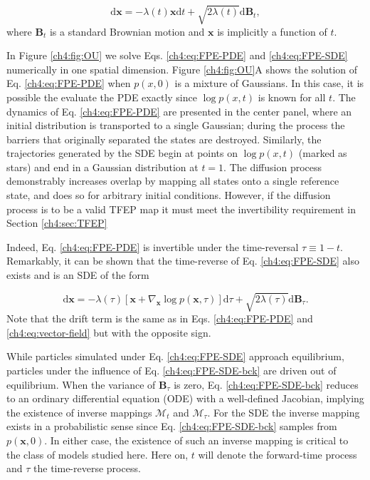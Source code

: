 \begin{equation}
    \mathrm{d}\mathbf{x} = -\lambda(t)\mathbf{x}\mathrm{d}t + \sqrt{2\lambda(t)}\mathrm{d}\mathbf{B}_t,
    \label{ch4:eq:FPE-SDE}
\end{equation}
where $\mathbf{B}_t$ is a standard Brownian motion and $\mathbf{x}$ is implicitly a function of $t$. 

In Figure \ref{ch4:fig:OU} we solve Eqs. \ref{ch4:eq:FPE-PDE} and \ref{ch4:eq:FPE-SDE} numerically in one spatial dimension. Figure \ref{ch4:fig:OU}A shows the solution of Eq. \ref{ch4:eq:FPE-PDE} when $p(x,0)$ is a mixture of Gaussians. In this case, it is possible the evaluate the PDE exactly since $\log p(x,t)$ is known for all $t$. The dynamics of Eq. \ref{ch4:eq:FPE-PDE} are presented in the center panel, where an initial distribution is transported to a single Gaussian; during the process the barriers that originally separated the states are destroyed. Similarly, the trajectories generated by the SDE begin at points on $\log p(x,t)$ (marked as stars) and end in a Gaussian distribution at $t=1$. The diffusion process demonstrably increases overlap by mapping all states onto a single reference state, and does so for arbitrary initial conditions. However, if the diffusion process is to be a valid TFEP map it must meet the invertibility requirement in Section \ref{ch4:sec:TFEP}

Indeed, Eq. \ref{ch4:eq:FPE-PDE} is invertible under the time-reversal $\tau \equiv 1 - t$. Remarkably, it can be shown that the time-reverse of Eq. \ref{ch4:eq:FPE-SDE} also exists \cite{Anderson1982} and is an SDE  of the form

\begin{equation}
    \mathrm{d}\mathbf{x} = -\lambda(\tau)\left[ \mathbf{x} + \nabla_{\mathbf{x}}\log p(\mathbf{x}, \tau)\right]\mathrm{d}\tau + \sqrt{2\lambda(\tau)}\mathrm{d}\mathbf{B}_\tau.
    \label{ch4:eq:FPE-SDE-bck}
\end{equation}
Note that the drift term is the same as in Eqs. \ref{ch4:eq:FPE-PDE} and \ref{ch4:eq:vector-field} but with the opposite sign.

While particles simulated under Eq. \ref{ch4:eq:FPE-SDE} approach equilibrium, particles under the influence of Eq. \ref{ch4:eq:FPE-SDE-bck} are driven out of equilibrium. When the variance of $\mathbf{B}_\tau$ is zero, Eq. \ref{ch4:eq:FPE-SDE-bck} reduces to an ordinary differential equation (ODE) with a well-defined Jacobian, implying the existence of inverse mappings $\mathcal{M}_t$ and $\mathcal{M}_\tau$. For the SDE the inverse mapping exists in a probabilistic sense since Eq. \ref{ch4:eq:FPE-SDE-bck} samples from $p(\mathbf{x},0)$. In either case, the existence of such an inverse mapping is critical to the class of models studied here.  Here on, $t$ will denote the forward-time process and $\tau$ the time-reverse process. 

